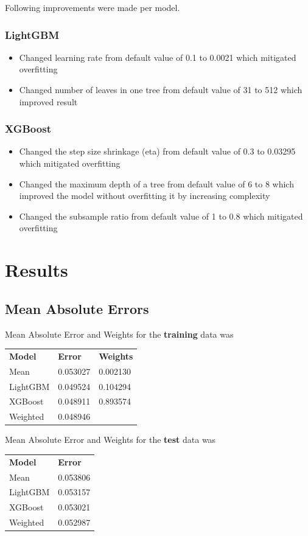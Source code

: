 \documentclass[a4paper]{article}
\begin{document}
Following improvements were made per model.
\subsubsection{LightGBM}
\begin{itemize}
    \item Changed learning rate from default value of 0.1 to 0.0021 which mitigated overfitting
    \item Changed number of leaves in one tree from default value of 31 to 512 which improved result
\end{itemize}
\subsubsection{XGBoost}
\begin{itemize}
    \item Changed the step size shrinkage (eta) from default value of 0.3 to 0.03295 which mitigated overfitting
    \item Changed the maximum depth of a tree from default value of 6 to 8 which improved the model without overfitting it by increasing complexity
    \item Changed the subsample ratio from default value of 1 to 0.8 which mitigated overfitting
\end{itemize}


\section{Results}

\subsection{Mean Absolute Errors}
Mean Absolute Error and Weights for the \textbf{training} data was
\begin{center}
\begin{tabular}{ l l l }
    \textbf{Model} & \textbf{Error} & \textbf{Weights} \\
    Mean & 0.053027 & 0.002130 \\
    LightGBM & 0.049524 & 0.104294 \\
    XGBoost  & 0.048911 & 0.893574 \\
    Weighted & 0.048946 & \\
\end{tabular}
\end{center}

Mean Absolute Error and Weights for the \textbf{test} data was
\begin{center}
\begin{tabular}{ l l }
    \textbf{Model} & \textbf{Error} \\
    Mean & 0.053806  \\
    LightGBM & 0.053157  \\
    XGBoost  & 0.053021  \\
    Weighted & 0.052987  \\
\end{tabular}
\end{center}
\end{document}
